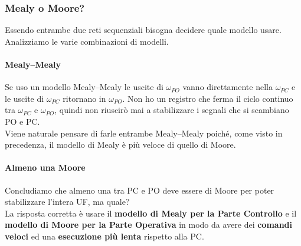\documentclass[10pt]{report}
\begin{document}
\subsubsection{Mealy o Moore?}
Essendo entrambe due reti sequenziali bisogna decidere quale modello usare. Analizziamo le varie combinazioni di modelli.
\paragraph{Mealy--Mealy} Se uso un modello Mealy--Mealy le uscite di $\omega_{PO}$ vanno direttamente nella $\omega_{PC}$ e le uscite di $\omega_{PC}$ ritornano in $\omega_{PO}$. Non ho un registro che ferma il ciclo continuo tra $\omega_{PC}$  e $\omega_{PO}$, quindi non riuscirò mai a stabilizzare i segnali che si scambiano PO e PC.\\
Viene naturale pensare di farle entrambe Mealy--Mealy poiché, come visto in precedenza, il modello di Mealy è più veloce di quello di Moore.
\paragraph{Almeno una Moore} Concludiamo che almeno una tra PC e PO deve essere di Moore per poter stabilizzare l'intera UF, ma quale?\\
La risposta corretta è usare il \textbf{modello di Mealy per la Parte Controllo} e il \textbf{modello di Moore per la Parte Operativa} in modo da avere dei \textbf{comandi veloci} ed una \textbf{esecuzione più lenta} rispetto alla PC.
\end{document}
